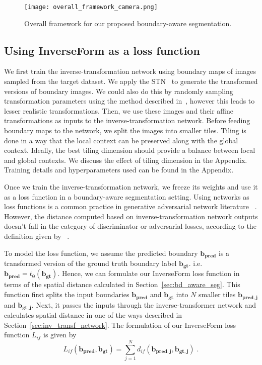 \documentclass[final]{cvpr}
\begin{document}
\begin{figure*}[t]
\centering
 \texttt{[image: overall\_framework\_camera.png]}
\caption{Overall framework for our proposed boundary-aware segmentation. } \label{fig:overall_framework}
\end{figure*}

\subsection{Using InverseForm as a loss function}

We first train the inverse-transformation network using boundary maps of images sampled from the target dataset. We apply the STN~\cite{spatialtx} to generate the transformed versions of boundary images. We could also do this by randomly sampling transformation parameters using the method described in~\cite{aetv2}, however this leads to lesser realistic transformations. Then, we use these images and their affine transformations as inputs to the inverse-transformation network. Before feeding boundary maps to the network, we split the images into smaller tiles. Tiling is done in a way that the local context can be preserved along with the global context. Ideally, the best tiling dimension should provide a balance between local and global contexts. We discuss the effect of tiling dimension in the Appendix. Training details and hyperparameters used can be found in the Appendix.

Once we train the inverse-transformation network, we freeze its weights and use it as a loss function in a boundary-aware segmentation setting. Using networks as loss functions is a common practice in generative adversarial network literature ~\cite{goodfellow2014generative}. However, the distance computed based on inverse-transformation network outputs doesn't fall in the category of discriminator or adversarial losses, according to the definition given by ~\cite{adversarialdef}.

To model the loss function, we assume the predicted boundary \(\boldsymbol{b_{pred}}\) is a transformed version of the ground truth boundary label \(\boldsymbol{b_{gt}}\). i.e. \(\boldsymbol{b_{pred}} = t_{\boldsymbol{\theta}}(\boldsymbol{b_{gt}}).\)
Hence, we can formulate our InverseForm loss function in terms of the spatial distance calculated in Section~\ref{sec:bd_aware_seg}. This function first splits the input boundaries \(\boldsymbol{b_{pred}}\) and \(\boldsymbol{b_{gt}}\) into $N$ smaller tiles \(\boldsymbol{b_{pred, j}}\) and \(\boldsymbol{b_{gt, j}}\). Next, it passes the inputs through the inverse-transformer network and calculates spatial distance in one of the ways described in Section~\ref{sec:inv_transf_network}. The formulation of our InverseForm loss function \(L_{if}\) is given by
\begin{equation}\label{eq:L_if}
L_{if}(\boldsymbol{b_{pred}}, \boldsymbol{b_{gt}}) = \sum_{j=1}^{N} d_{if}(\boldsymbol{b_{pred, j}}, \boldsymbol{b_{gt, j}}) \;.
\end{equation}
\end{document}
